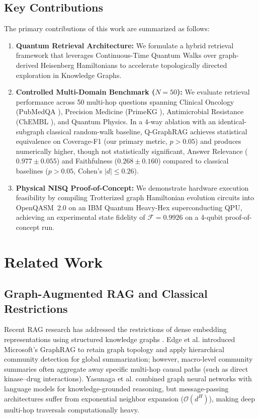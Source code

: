\documentclass{llncs}
\begin{document}
\subsection{Key Contributions}
The primary contributions of this work are summarized as follows:
\begin{enumerate}
    \item \textbf{Quantum Retrieval Architecture:} We formulate a hybrid retrieval framework that leverages Continuous-Time Quantum Walks over graph-derived Heisenberg Hamiltonians to accelerate topologically directed exploration in Knowledge Graphs.
    \item \textbf{Controlled Multi-Domain Benchmark ($N = 50$):} We evaluate retrieval performance across 50 multi-hop questions spanning Clinical Oncology (PubMedQA \cite{jin2019pubmedqa}), Precision Medicine (PrimeKG \cite{chandak2023building}), Antimicrobial Resistance (ChEMBL \cite{gaulton2012chembl}), and Quantum Physics. In a 4-way ablation with an identical-subgraph classical random-walk baseline, Q-GraphRAG achieves statistical equivalence on Coverage-F1 (our primary metric, $p > 0.05$) and produces numerically higher, though not statistically significant, Answer Relevance ($0.977 \pm 0.055$) and Faithfulness ($0.268 \pm 0.160$) compared to classical baselines ($p > 0.05$, Cohen's $|d| \le 0.26$).
    \item \textbf{Physical NISQ Proof-of-Concept:} We demonstrate hardware execution feasibility by compiling Trotterized graph Hamiltonian evolution circuits into OpenQASM~2.0 on an IBM Quantum Heavy-Hex superconducting QPU, achieving an experimental state fidelity of $\mathcal{F} = 0.9926$ on a 4-qubit proof-of-concept run.
\end{enumerate}

\section{Related Work}\label{sec:related_work}

\subsection{Graph-Augmented RAG and Classical Restrictions}
Recent RAG research has addressed the restrictions of dense embedding representations using structured knowledge graphs \cite{karpukhin2020dense,pan2024unifying}. Edge et al. \cite{edge2024graphrag} introduced Microsoft's GraphRAG to retain graph topology and apply hierarchical community detection for global summarization; however, macro-level community summaries often aggregate away specific multi-hop causal paths (such as direct kinase--drug interactions). Yasunaga et al. \cite{yasunaga2021qagnn} combined graph neural networks with language models for knowledge-grounded reasoning, but message-passing architectures suffer from exponential neighbor expansion ($\mathcal{O}(d^H)$), making deep multi-hop traversals computationally heavy. 
\end{document}
